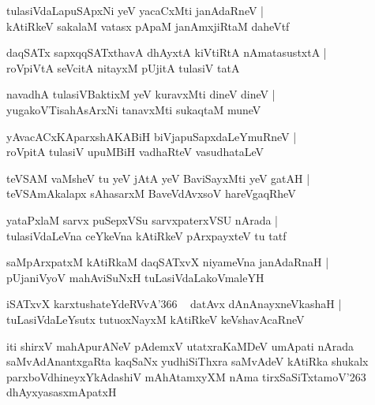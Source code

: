 \documentclass[twoside,12pt,openright]{book}
\def\S{\char'263}
\newcounter{shloka}[chapter]
\begin{document}
\begin{shloka}%
tulasiVdaLapuSApxNi yeV yacaCxMti janAdaRneV |\\
kAtiRkeV sakalaM vatasx pApaM janAmxjiRtaM daheVtf
\end{shloka}

\begin{shloka}%
daqSATx sapxqqSATxthavA dhAyxtA kiVtiRtA nAmatasustxtA |\\
roVpiVtA seVcitA nitayxM pUjitA tulasiV tatA 
\end{shloka}

\begin{shloka}%
navadhA tulasiVBaktixM yeV kuravxMti dineV dineV |\\
yugakoVTisahAsArxNi tanavxMti sukaqtaM muneV 
\end{shloka}

\begin{shloka}%
yAvacACxKAparxshAKABiH biVjapuSapxdaLeYmuRneV |\\
roVpitA tulasiV upuMBiH vadhaRteV vasudhataLeV 
\end{shloka}

\begin{shloka}%
teVSAM vaMsheV tu yeV jAtA yeV BaviSayxMti yeV gatAH |\\
teVSAmAkalapx sAhasarxM BaveVdAvxsoV hareVgaqRheV 
\end{shloka}

\begin{shloka}%
yataPxlaM sarvx puSepxVSu sarvxpaterxVSU nArada |\\
tulasiVdaLeVna ceYkeVna kAtiRkeV pArxpayxteV tu tatf
\end{shloka}

\begin{shloka}%
saMpArxpatxM kAtiRkaM daqSATxvX niyameVna janAdaRnaH |\\
pUjaniVyoV mahAviSuNxH tuLasiVdaLakoVmaleYH
\end{shloka}

\begin{shloka}%
iSATxvX karxtushateYdeRVvA\char'366 ~ datAvx dAnAnayxneVkashaH |\\
tuLasiVdaLeYsutx tutuoxNayxM kAtiRkeV keVshavAcaRneV
\end{shloka}

\begin{center}
iti shirxV mahApurANeV pAdemxV utatxraKaMDeV umApati nArada saMvAdAnantxgaRta kaqSaNx
yudhiSiThxra saMvAdeV kAtiRka shukalx parxboVdhineyxYkAdashiV mAhAtamxyXM nAma tirxSaSiTxtamoV\S 
dhAyxyasasxmApatxH
\end{center}
\end{document}
